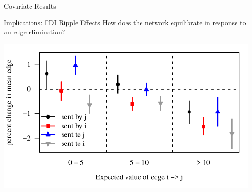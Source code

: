 \documentclass{beamer}
\begin{document}
\begin{frame}{Covariate Results}

\end{frame}



\begin{frame}{Implications: FDI Ripple Effects}
How does the network equilibrate in response to an edge elimination?

\centering
\includegraphics[scale=.65]{slides_figures/contagion_simulation_results} \vspace{-.5cm}\\

\end{frame}
\end{document}
